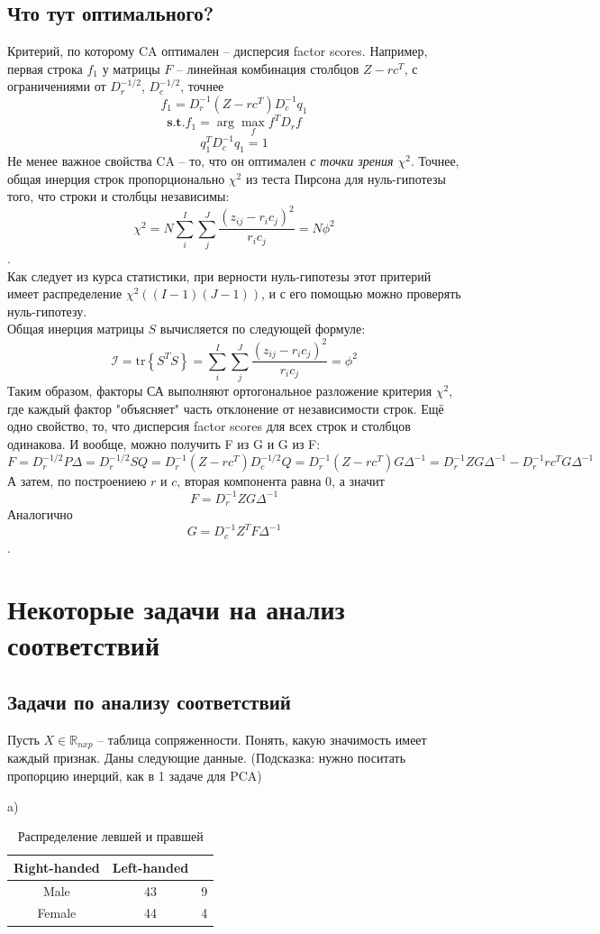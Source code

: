 \subsection{Что тут оптимального?}
Критерий, по которому CA оптимален -- дисперсия factor scores. Например, первая строка $f_1$ у матрицы $F$ -- линейная комбинация столбцов $Z-rc^T$, с ограничениями от $D_r^{-1/2}$, $D_c^{-1/2}$, точнее $$f_1=D^{-1}_r(Z-rc^T)D^{-1}_cq_1$$$$\textbf{s.t.} f_1=\arg\max\limits_{f}f^TD_rf$$$$ q_1^TD_c^{-1}q_1=1$$
Не менее важное свойства CA -- то, что он оптимален \textit{с точки зрения $\chi^2$}. Точнее, общая инерция строк пропорционально $\chi^2$ из теста Пирсона для нуль-гипотезы того, что строки и столбцы независимы:
$$\chi^2=N\sum_i^I\sum_j^J\frac{(z_{ij}-r_ic_j)^2}{r_ic_j}=N\phi^2$$.\\
Как следует из курса статистики, при верности нуль-гипотезы этот притерий имеет распределение $\chi^2\left((I-1)(J-1)\right)$, и с его помощью можно проверять нуль-гипотезу.\\
Общая инерция матрицы $S$ вычисляется по следующей формуле:
$$\mathcal{I}=\text{tr}\left\{S^TS\right\}=\sum_i^I\sum_j^J\frac{(z_{ij}-r_ic_j)^2}{r_ic_j}=\phi^2$$
Таким образом, факторы СА выполняют ортогональное разложение критерия $\chi^2$, где каждый фактор "объясняет" часть отклонение от независимости строк.
Ещё одно свойство, то, что дисперсия factor scores для всех строк и столбцов одинакова. И вообще, можно получить F из G и G из F:
$$F=D_r^{-1/2}P\Delta=D_r^{-1/2}SQ=D_r^{-1}(Z-rc^T)D_c^{-1/2}Q=D_r^{-1}(Z-rc^T)G\Delta^{-1}=D_r^{-1}ZG\Delta^{-1}-D_r^{-1}rc^TG\Delta^{-1}$$
А затем, по построениею $r$ и $c$, вторая компонента равна 0, а значит
$$F=D_r^{-1}ZG\Delta^{-1}$$
Аналогично $$G=D_c^{-1}Z^TF\Delta^{-1}$$.
\section{Некоторые задачи на анализ соответствий}
\subsection{Задачи по анализу соответствий}
\problem Пусть $X\in\mathbb{R}_{nxp}$ -- таблица сопряженности. Понять, какую значимость имеет каждый признак. Даны следующие данные.
(Подсказка: нужно поситать пропорцию инерций, как в 1 задаче для PCA)

a) \begin{table}[H]\centering
    \begin{tabular}{ccc}
        \toprule
        Right-handed  & Left-handed     \\
        \midrule Male & 43          & 9 \\
        Female        & 44          & 4 \\
        \bottomrule
    \end{tabular}
    \caption{Распределение левшей и правшей}
\end{table}

